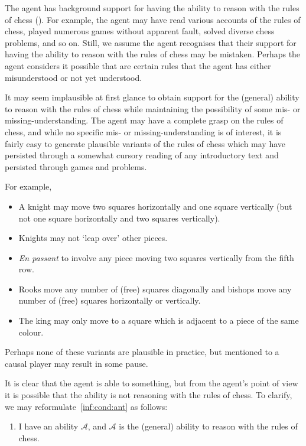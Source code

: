 \documentclass[10pt]{article}
\begin{document}
\begin{note}
The agent has background support for having the ability to reason with the rules of chess (\label{inf:cond:ant}).
For example, the agent may have read various accounts of the rules of chess, played numerous games without apparent fault, solved diverse chess problems, and so on.
Still, we assume the agent recognises that their support for having the ability to reason with the rules of chess may be mistaken.
Perhaps the agent considers it possible that are certain rules that the agent has either misunderstood or not yet understood.

It may seem implausible at first glance to obtain support for the (general) ability to reason with the rules of chess while maintaining the possibility of some mis- or missing-understanding.
The agent may have a complete grasp on the rules of chess, and while no specific mis- or missing-understanding is of interest, it is fairly easy to generate plausible variants of the rules of chess which may have persisted through a somewhat cursory reading of any introductory text and persisted through games and problems.

For example,
\begin{itemize}
\item A knight may move two squares horizontally and one square vertically (but not one square horizontally and two squares vertically).
\item Knights may not `leap over' other pieces.
\item \emph{En passant} to involve any piece moving two squares vertically from the fifth row.
\item Rooks move any number of (free) squares diagonally and bishops move any number of (free) squares horizontally or vertically.
\item The king may only move to a square which is adjacent to a piece of the same colour.
\end{itemize}
Perhaps none of these variants are plausible in practice, but mentioned to a causal player may result in some pause.

It is clear that the agent is able to something, but from the agent's point of view it is possible that the ability is not reasoning with the rules of chess.
To clarify, we may reformulate~\ref{inf:cond:ant} as follows:
  \begin{enumerate}[label=(S\arabic*\('\)), ref=(S\arabic*\('\))]
\item\label{inf:cond:antp} I have an ability \(\mathcal{A}\), and \(\mathcal{A}\) is the (general) ability to reason with the rules of chess.
\end{enumerate}
\end{note}
\end{document}
